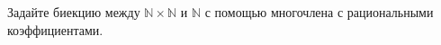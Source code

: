 Задайте биекцию между $\mathbb{N} \times \mathbb{N}$ и $\mathbb{N}$ с помощью многочлена с рациональными
коэффициентами.
